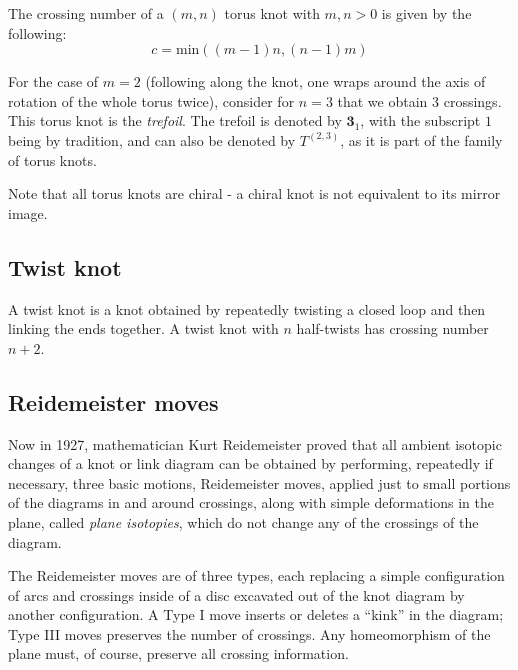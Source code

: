 \documentclass[a4paper,titlepage,twoside]{book}
\begin{document}
The crossing number of a $(m,n)$ torus knot with $m,n >0$ is given by the following:
\[
c = \text{min}{ ((m-1)n, (n-1)m ) }
\]

For the case of $m=2$ (following along the knot, one wraps around the axis of rotation of the whole torus twice), consider for $n=3$ that we obtain 3 crossings.  This torus knot is the \emph{trefoil}.  The trefoil is denoted by $\mathbf{3}_1$, with the subscript $1$ being by tradition, and can also be denoted by $T^{(2,3)}$, as it is part of the family of torus knots.

Note that all torus knots are chiral - a chiral knot is not equivalent to its mirror image.  

\subsection{Twist knot}

A twist knot is a knot obtained by repeatedly twisting a closed loop and then linking the ends together.  A twist knot with $n$ half-twists has crossing number $n+2$.  

\subsection{Reidemeister moves }

Now in 1927, mathematician Kurt Reidemeister proved that all ambient isotopic changes of a knot or link diagram can be obtained by performing, repeatedly if necessary, three basic motions, Reidemeister moves, applied just to small portions of the diagrams in and around crossings, along with simple deformations in the plane, called \emph{plane isotopies}, which do not change any of the crossings of the diagram.  

The Reidemeister moves are of three types, each replacing a simple configuration of arcs and crossings inside of a disc excavated out of the knot diagram by another configuration.  A Type I move inserts or deletes a ``kink'' in the diagram; Type III moves preserves the number of crossings.  Any homeomorphism of the plane must, of course, preserve all crossing information.  
\end{document}
